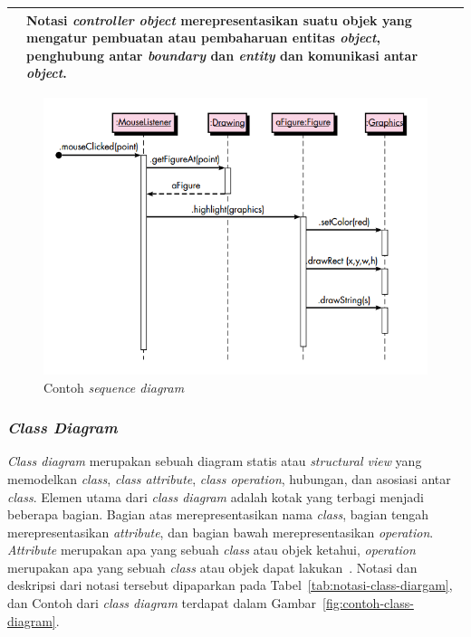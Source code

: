 \begin{longtable}{|>{\centering}m{5cm}|m{7cm}|}
                         & Notasi \emph{controller object}
                           merepresentasikan suatu objek yang mengatur
                           pembuatan atau pembaharuan entitas
                           \emph{object}, penghubung antar
                           \emph{boundary} dan \emph{entity} dan
                           komunikasi antar \emph{object}. \\\hline

\end{longtable}

\begin{figure}[tph]
  \centering
  \includegraphics[width=.7\linewidth]{img/contoh-sequence}
  \caption{Contoh \emph{sequence diagram} \parencite{pressman2010software}}
   \label{fig:contoh-sequence-diagram}
\end{figure}


\subsubsection{\emph{Class Diagram}}

\emph{Class diagram} merupakan sebuah diagram statis atau \emph{structural view}
yang memodelkan \emph{class}, \emph{class attribute}, \emph{class operation},
hubungan, dan asosiasi antar \emph{class}. Elemen utama dari \emph{class
  diagram} adalah kotak yang terbagi menjadi beberapa bagian. Bagian atas
merepresentasikan nama \emph{class}, bagian tengah merepresentasikan
\emph{attribute}, dan bagian bawah merepresentasikan
\emph{operation}. \emph{Attribute} merupakan apa yang sebuah \emph{class} atau
objek ketahui, \emph{operation} merupakan apa yang sebuah \emph{class} atau
objek dapat lakukan~\parencite{pressman2010software}. Notasi dan deskripsi dari
notasi tersebut dipaparkan pada Tabel~\ref{tab:notasi-class-diargam}, dan Contoh
dari \emph{class diagram} terdapat dalam Gambar~\ref{fig:contoh-class-diagram}.

